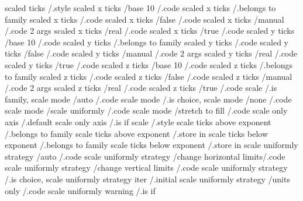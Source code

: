scaled ticks                                          /.style                  
scaled x ticks               /base 10                 /.code
scaled x ticks                                        /.belongs to family      
scaled x ticks                                        /.code                   
scaled x ticks               /false                   /.code
scaled x ticks               /manual                  /.code 2 args
scaled x ticks               /real                    /.code
scaled x ticks               /true                    /.code
scaled y ticks               /base 10                 /.code
scaled y ticks                                        /.belongs to family      
scaled y ticks                                        /.code                   
scaled y ticks               /false                   /.code
scaled y ticks               /manual                  /.code 2 args
scaled y ticks               /real                    /.code
scaled y ticks               /true                    /.code
scaled z ticks               /base 10                 /.code
scaled z ticks                                        /.belongs to family      
scaled z ticks                                        /.code                   
scaled z ticks               /false                   /.code
scaled z ticks               /manual                  /.code 2 args
scaled z ticks               /real                    /.code
scaled z ticks               /true                    /.code
scale                                                 /.is family,             
scale mode                   /auto                    /.code
scale mode                                            /.is choice,             
scale mode                   /none                    /.code
scale mode                   /scale uniformly         /.code
scale mode                   /stretch to fill         /.code
scale only axis                                       /.default                
scale only axis                                       /.is if                  
scale                                                 /.style                  
scale ticks above exponent                            /.belongs to family      
scale ticks above exponent                            /.store in               
scale ticks below exponent                            /.belongs to family      
scale ticks below exponent                            /.store in               
scale uniformly strategy     /auto                    /.code
scale uniformly strategy     /change horizontal limits/.code
scale uniformly strategy     /change vertical limits  /.code
scale uniformly strategy                              /.is choice,             
scale uniformly strategy iter                         /.initial                
scale uniformly strategy     /units only              /.code
scale uniformly warning                               /.is if                  

